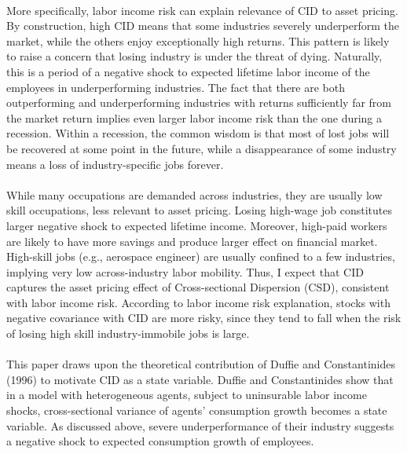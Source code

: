 \documentclass[12pt]{article}
\begin{document}
\paragraph{}
More specifically, labor income risk can explain relevance of CID to asset pricing. By construction, high CID means that some industries severely underperform the market, while the others enjoy exceptionally high returns. This pattern is likely to raise a concern that losing industry is under the threat of dying. Naturally, this is a period of a negative shock to expected lifetime labor income of the employees in underperforming industries. The fact that there are both outperforming and underperforming industries with returns sufficiently far from the market return implies even larger labor income risk than the one during a recession. Within a recession, the common wisdom is that most of lost jobs will be recovered at some point in the future, while a disappearance of some industry means a loss of industry-specific jobs forever. 
\paragraph{}
While many occupations are demanded across industries, they are usually low skill occupations, less relevant to asset pricing. Losing high-wage job constitutes larger negative shock to expected lifetime income. Moreover, high-paid workers are likely to have more savings and produce larger effect on financial market. High-skill jobs (e.g., aerospace engineer) are usually confined to a few industries, implying very low across-industry labor mobility. Thus, I expect that CID captures the asset pricing effect of Cross-sectional Dispersion (CSD), consistent with labor income risk. According to labor income risk explanation, stocks with negative covariance with CID are more risky, since they tend to fall when the risk of losing high skill industry-immobile jobs is large.
\paragraph{}
This paper draws upon the theoretical contribution of Duffie and Constantinides (1996) to motivate CID as a state variable. Duffie and Constantinides show that in a model with heterogeneous agents, subject to uninsurable labor income shocks, cross-sectional variance of agents' consumption growth becomes a state variable. As discussed above, severe underperformance of their industry suggests a negative shock to expected consumption growth of employees.
\end{document}
